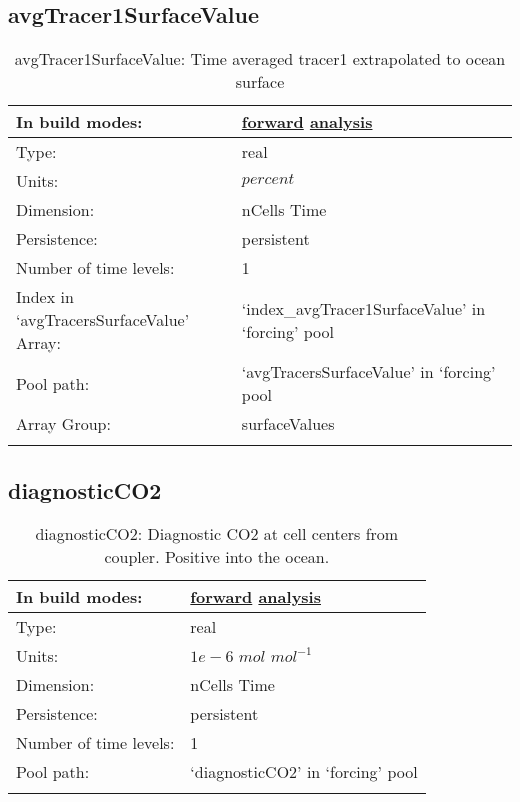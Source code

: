 \subsection[avgTracer1SurfaceValue]{avgTracer1SurfaceValue}
\label{subsec:var_sec_forcing_avgTracer1SurfaceValue}
\begin{center}
\begin{longtable}{| p{2.0in} | p{4.0in} |}
        \hline 
        In build modes: & \hyperref[subsec:forward_var_tab_forcing]{forward} \hyperref[subsec:analysis_var_tab_forcing]{analysis} \\
        \hline 
        Type: & real \\
        \hline 
        Units: & $percent$ \\
        \hline 
        Dimension: & nCells Time \\
        \hline 
        Persistence: & persistent \\
        \hline 
        Number of time levels: & 1 \\
        \hline 
		 Index in `avgTracersSurfaceValue' Array: & `index\_avgTracer1SurfaceValue' in `forcing' pool \\
		 \hline 
            Pool path: & `avgTracersSurfaceValue' in `forcing' pool \\
		 \hline 
		 Array Group: & surfaceValues \\
		 \hline 
    \caption{avgTracer1SurfaceValue: Time averaged tracer1 extrapolated to ocean surface}
\end{longtable}
\end{center}
\subsection[diagnosticCO2]{diagnosticCO2}
\label{subsec:var_sec_forcing_diagnosticCO2}
\begin{center}
\begin{longtable}{| p{2.0in} | p{4.0in} |}
        \hline 
        In build modes: & \hyperref[subsec:forward_var_tab_forcing]{forward} \hyperref[subsec:analysis_var_tab_forcing]{analysis} \\
        \hline 
        Type: & real \\
        \hline 
        Units: & $1e-6$ $mol$ $mol^{-1}$ \\
        \hline 
        Dimension: & nCells Time \\
        \hline 
        Persistence: & persistent \\
        \hline 
        Number of time levels: & 1 \\
        \hline 
            Pool path: & `diagnosticCO2' in `forcing' pool \\
		 \hline 
    \caption{diagnosticCO2: Diagnostic CO2 at cell centers from coupler. Positive into the ocean.}
\end{longtable}
\end{center}

